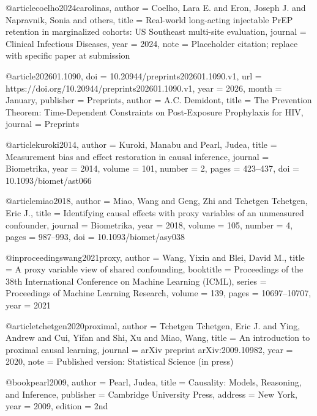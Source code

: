 @article{coelho2024carolinas,
  author  = {Coelho, Lara E. and Eron, Joseph J. and Napravnik, Sonia and others},
  title   = {Real-world long-acting injectable {PrEP} retention in marginalized cohorts: {US} {Southeast} multi-site evaluation},
  journal = {Clinical Infectious Diseases},
  year    = {2024},
  note    = {Placeholder citation; replace with specific paper at submission}
}

@article{202601.1090,
	doi = {10.20944/preprints202601.1090.v1},
	url = {https://doi.org/10.20944/preprints202601.1090.v1},
	year = 2026,
	month = {January},
	publisher = {Preprints},
	author = {A.C. Demidont},
	title = {The Prevention Theorem: Time-Dependent Constraints on Post-Exposure Prophylaxis for HIV},
	journal = {Preprints}
}

@article{kuroki2014,
  author  = {Kuroki, Manabu and Pearl, Judea},
  title   = {Measurement bias and effect restoration in causal inference},
  journal = {Biometrika},
  year    = {2014},
  volume  = {101},
  number  = {2},
  pages   = {423--437},
  doi     = {10.1093/biomet/ast066}
}

@article{miao2018,
  author  = {Miao, Wang and Geng, Zhi and Tchetgen Tchetgen, Eric J.},
  title   = {Identifying causal effects with proxy variables of an unmeasured confounder},
  journal = {Biometrika},
  year    = {2018},
  volume  = {105},
  number  = {4},
  pages   = {987--993},
  doi     = {10.1093/biomet/asy038}
}

@inproceedings{wang2021proxy,
  author    = {Wang, Yixin and Blei, David M.},
  title     = {A proxy variable view of shared confounding},
  booktitle = {Proceedings of the 38th International Conference on Machine Learning (ICML)},
  series    = {Proceedings of Machine Learning Research},
  volume    = {139},
  pages     = {10697--10707},
  year      = {2021}
}

@article{tchetgen2020proximal,
  author  = {Tchetgen Tchetgen, Eric J. and Ying, Andrew and Cui, Yifan and Shi, Xu and Miao, Wang},
  title   = {An introduction to proximal causal learning},
  journal = {arXiv preprint arXiv:2009.10982},
  year    = {2020},
  note    = {Published version: Statistical Science (in press)}
}

@book{pearl2009,
  author    = {Pearl, Judea},
  title     = {Causality: Models, Reasoning, and Inference},
  publisher = {Cambridge University Press},
  address   = {New York},
  year      = {2009},
  edition   = {2nd}
}